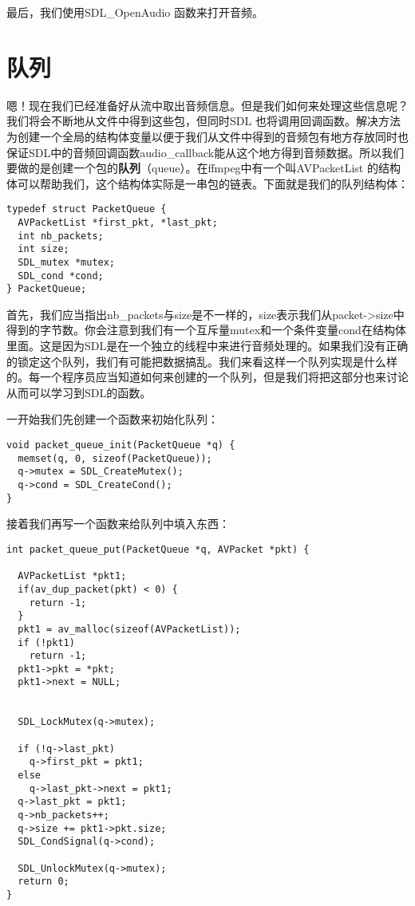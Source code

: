 最后，我们使用SDL_OpenAudio 函数来打开音频。

\section{队列}

嗯！现在我们已经准备好从流中取出音频信息。但是我们如何来处理这些信息呢？我们将会不断地从文件中得到这些包，但同时SDL 也将调用回调函数。解决方法为创建一个全局的结构体变量以便于我们从文件中得到的音频包有地方存放同时也保证SDL中的音频回调函数audio_callback能从这个地方得到音频数据。所以我们要做的是创建一个包的\textbf{队列}（queue）。在ffmpeg中有一个叫AVPacketList 的结构体可以帮助我们，这个结构体实际是一串包的链表。下面就是我们的队列结构体：

\begin{lstlisting}
typedef struct PacketQueue {
  AVPacketList *first_pkt, *last_pkt;
  int nb_packets;
  int size;
  SDL_mutex *mutex;
  SDL_cond *cond;
} PacketQueue;
\end{lstlisting}

首先，我们应当指出nb_packets与size是不一样的，size表示我们从packet->size中得到的字节数。你会注意到我们有一个互斥量mutex和一个条件变量cond在结构体里面。这是因为SDL是在一个独立的线程中来进行音频处理的。如果我们没有正确的锁定这个队列，我们有可能把数据搞乱。我们来看这样一个队列实现是什么样的。每一个程序员应当知道如何来创建的一个队列，但是我们将把这部分也来讨论从而可以学习到SDL的函数。

一开始我们先创建一个函数来初始化队列：
\begin{lstlisting}
void packet_queue_init(PacketQueue *q) {
  memset(q, 0, sizeof(PacketQueue));
  q->mutex = SDL_CreateMutex();
  q->cond = SDL_CreateCond();
}
\end{lstlisting}

接着我们再写一个函数来给队列中填入东西：
\begin{lstlisting}
int packet_queue_put(PacketQueue *q, AVPacket *pkt) {

  AVPacketList *pkt1;
  if(av_dup_packet(pkt) < 0) {
    return -1;
  }
  pkt1 = av_malloc(sizeof(AVPacketList));
  if (!pkt1)
    return -1;
  pkt1->pkt = *pkt;
  pkt1->next = NULL;


  SDL_LockMutex(q->mutex);

  if (!q->last_pkt)
    q->first_pkt = pkt1;
  else
    q->last_pkt->next = pkt1;
  q->last_pkt = pkt1;
  q->nb_packets++;
  q->size += pkt1->pkt.size;
  SDL_CondSignal(q->cond);

  SDL_UnlockMutex(q->mutex);
  return 0;
}
\end{lstlisting}

